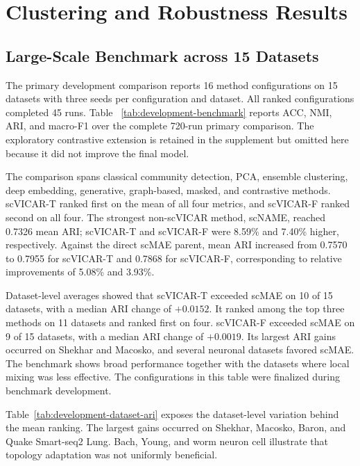 \section{Clustering and Robustness Results}
\label{sec:results}

\subsection{Large-Scale Benchmark across 15 Datasets}

The primary development comparison reports 16 method configurations on 15
datasets with three seeds per configuration and dataset. All ranked
configurations completed 45 runs. Table
~\ref{tab:development-benchmark} reports ACC, NMI, ARI, and macro-F1 over the
complete 720-run primary comparison. The exploratory contrastive extension is
retained in the supplement but omitted here because it did not improve the final model.



The comparison spans classical community detection, PCA, ensemble clustering,
deep embedding, generative, graph-based, masked, and contrastive methods.
scVICAR-T ranked first on the mean of all four metrics, and scVICAR-F ranked
second on all four. The strongest non-scVICAR method, scNAME, reached 0.7326
mean ARI; scVICAR-T and scVICAR-F were 8.59\% and 7.40\% higher, respectively.
Against the direct scMAE parent, mean ARI increased from 0.7570 to 0.7955 for
scVICAR-T and 0.7868 for scVICAR-F, corresponding to relative improvements of
5.08\% and 3.93\%.

Dataset-level averages showed that scVICAR-T exceeded scMAE on 10 of 15
datasets, with a median ARI change of $+0.0152$. It ranked among the top three
methods on 11 datasets and ranked first on four. scVICAR-F exceeded scMAE on
9 of 15 datasets, with a median ARI change of $+0.0019$. Its largest ARI gains
occurred on Shekhar and Macosko, and several neuronal datasets favored
scMAE. The benchmark shows broad performance together with the datasets where
local mixing was less effective. The configurations in this
table were finalized during benchmark development.



Table~\ref{tab:development-dataset-ari} exposes the dataset-level variation
behind the mean ranking. The largest gains occurred on Shekhar, Macosko, Baron,
and Quake Smart-seq2 Lung. Bach, Young, and worm neuron cell illustrate that
topology adaptation was not uniformly beneficial.

